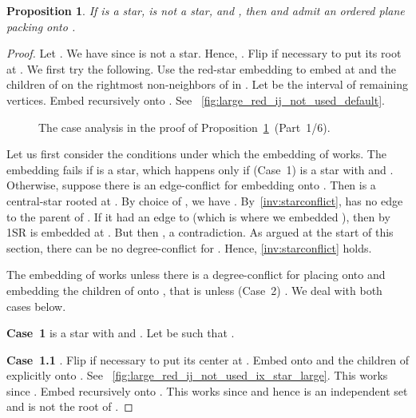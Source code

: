 \documentclass[11pt,a4paper,colorlinks=true,urlcolor=blue,citecolor=red]{article}
\theoremstyle{plain}
\newtheorem{proposition}[theorem]{Proposition}
\newcommand{\case}[1]{\par\vspace{.5\baselineskip}\noindent\textbf{\sffamily Case~#1}}
\begin{document}
\begin{proposition}\label{prop:rec_large_red_star_ij_not_used_sp_not_star}
  If  is a star,  is not a star, and
  , then  and  admit an ordered plane
  packing onto .
\end{proposition}
\begin{proof}
  Let . We have  since  is not a star.
  Hence, . Flip  if necessary to put its
  root at . We first try the following. Use the red-star
  embedding to embed  at  and the children of  on the
   rightmost non-neighbors of  in . Let  be
  the interval of remaining vertices. Embed  recursively onto .
  See \figurename~\ref{fig:large_red_ij_not_used_default}.

  \begin{figure}[b]
    \centering\hfil {}\hfil {}\hfil {}\hfil {}\hfil \caption{The case analysis in the proof of
      Proposition~\ref{prop:rec_large_red_star_ij_not_used_sp_not_star}~(Part~1/6).}
  \end{figure}

  Let us first consider the conditions under which the embedding of
   works.
The embedding fails if  is a star, which happens only if
  (Case~1)  is a star with  and
  . Otherwise, suppose there is an edge-conflict for
  embedding  onto . Then  is a
  central-star rooted at . By choice of , we have
  . By~\ref{inv:starconflict},  has no edge to the
  parent of . If it had an edge to  (which is where we embedded
  ), then by 1SR  is embedded at . But then ,
  a contradiction. As argued at the start of this section, there can be
  no degree-conflict for . Hence, \ref{inv:starconflict} holds.

  The embedding of  works unless there is a degree-conflict for
  placing  onto  and embedding the children of  onto
  , that is unless (Case~2)
  . We deal with both cases below.

  \case{1}  is a star with  and
  . Let  be such that .

  \case{1.1} . Flip  if necessary to put its
  center at . Embed  onto  and the children of  explicitly
  onto . See
  \figurename~\ref{fig:large_red_ij_not_used_ix_star_large}. This works
  since . Embed  recursively onto .
  This works since  and hence  is an
  independent set and  is not the root of .


\end{proof}
\end{document}
